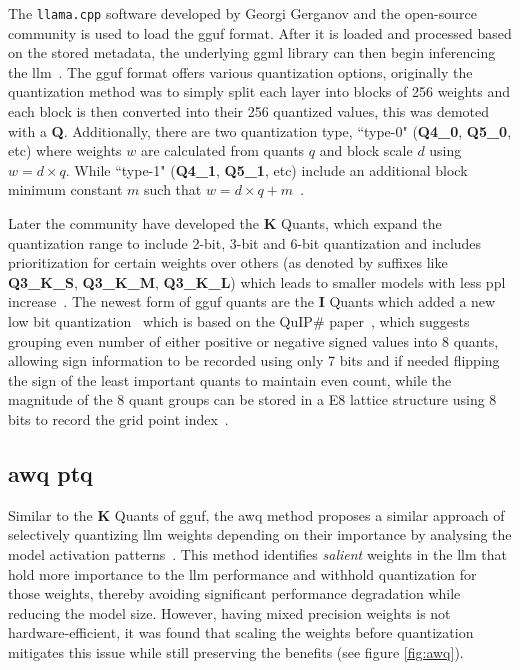 \documentclass{ifacconf}
\begin{document}
	The \texttt{llama.cpp} software developed by Georgi Gerganov and the open-source community is used to load the \gls{gguf} format. After it is loaded and processed based on the stored metadata, the underlying \gls{ggml} library can then begin inferencing the \gls{llm}~\cite{ggufgithub}. The \gls{gguf} format offers various quantization options, originally the quantization method was to simply split each layer into blocks of 256 weights and each block is then converted into their 256 quantized values, this was demoted with a \textbf{Q}. Additionally, there are two quantization type, ``type-0" (\textbf{Q4\_0}, \textbf{Q5\_0}, etc) where weights $w$ are calculated from quants $q$ and block scale $d$ using $w = d \times q$. While ``type-1" (\textbf{Q4\_1}, \textbf{Q5\_1}, etc) include an additional block minimum constant $m$ such that $w = d \times q + m$~\cite{ggufgithubquantdoc, ggufgithubkquantpr}. 
	
	Later the community have developed the \textbf{K} Quants, which expand the quantization range to include 2-bit, 3-bit and 6-bit quantization and includes prioritization for certain weights over others (as denoted by suffixes like \textbf{Q3\_K\_S}, \textbf{Q3\_K\_M}, \textbf{Q3\_K\_L}) which leads to smaller models with less \gls{ppl} increase~\cite{ggufgithubkquantpr}. The newest form of \gls{gguf} quants are the \textbf{I} Quants which added a new low bit quantization~\cite{ggufgithubiquantpr} which is based on the QuIP\# paper~\cite{tseng2024quipbetterllmquantization}, which suggests grouping even number of either positive or negative signed values into 8 quants, allowing sign information to be recorded using only 7 bits and if needed flipping the sign of the least important quants to maintain even count, while the magnitude of the 8 quant groups can be stored in a E8 lattice structure using 8 bits to record the grid point index~\cite{ggufgithubiquantpr}. 
	
	\subsection{\gls{awq} \gls{ptq}}
	
	Similar to the \textbf{K} Quants of \gls{gguf}, the \gls{awq} method proposes a similar approach of selectively quantizing \gls{llm} weights depending on their importance by analysing the model activation patterns~\cite{lin2024awqactivationawareweightquantization}. This method identifies \textit{salient} weights in the \gls{llm} that hold more importance to the \gls{llm} performance and withhold quantization for those weights, thereby avoiding significant performance degradation while reducing the model size. However, having  mixed precision weights is not hardware-efficient, it was found that scaling the weights before quantization mitigates this issue while still preserving the benefits (see figure \ref{fig:awq}).
	
\end{document}
